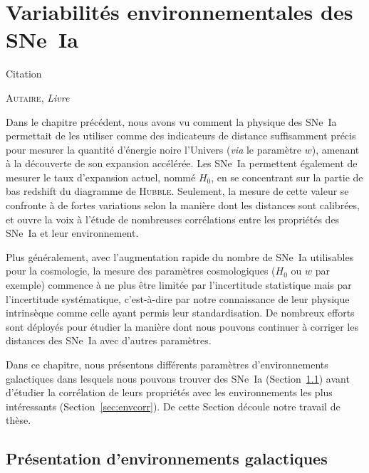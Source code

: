 \documentclass[../main/main.tex]{subfiles}
\begin{document}

\chapter{Variabilit\'es environnementales des SNe~Ia}\label{ch:env}
\epigraph{\openquote Citation\closequote}{\textsc{Autaire}, \textit{Livre}}

Dans le chapitre précédent, nous avons vu comment la physique des SNe~Ia
permettait de les utiliser comme des indicateurs de distance suffisamment précis
pour mesurer la quantité d'énergie noire l'Univers (\textit{via} le paramètre
$w$), amenant à la découverte de son expansion accélérée. Les SNe~Ia permettent
également de mesurer le taux d'expansion actuel, nommé $H_0$, en se concentrant
sur la partie de bas redshift du diagramme de \textsc{Hubble}. Seulement, la
mesure de cette valeur se confronte à de fortes variations selon la manière dont
les distances sont calibrées, et ouvre la voix à l'étude de nombreuses
corrélations entre les propriétés des SNe~Ia et leur environnement.

Plus généralement, avec l'augmentation rapide du nombre de SNe~Ia utilisables
pour la cosmologie, la mesure des paramètres cosmologiques ($H_0$ ou $w$ par
exemple) commence à ne plus être limitée par l'incertitude statistique mais par
l'incertitude systématique, c'est-à-dire par notre connaissance de leur physique
intrinsèque comme celle ayant permis leur standardisation. De nombreux efforts
sont déployés pour étudier la manière dont nous pouvons continuer à corriger les
distances des SNe~Ia avec d'autres paramètres.

Dans ce chapitre, nous présentons différents paramètres d'environnements
galactiques dans lesquels nous pouvons trouver des SNe~Ia
(Section~\ref{sec:envpres}) avant d'étudier la corrélation de leurs propriétés
avec les environnements les plus intéressants (Section~\ref{sec:envcorr}). De
cette Section découle notre travail de thèse.

\vfill
\minitoc
\vfill
\newpage

\section{Présentation d'environnements galactiques}\label{sec:envpres}
\end{document}
